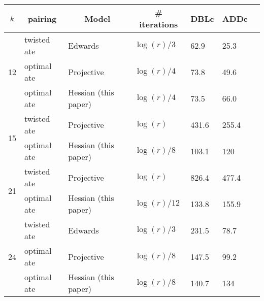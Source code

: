 \begin{table}[h]
\begin{tabular}{|l| l| l| l| l| l| l|}
\hline
\multicolumn{1}{|c|}{$k$}
&\multicolumn{1}{|c|}{pairing} 
&\multicolumn{1}{|c|}{Model}
&\multicolumn{1}{|c|}{\# iterations}
&\multicolumn{1}{|c|}{DBLc}	
&\multicolumn{1}{|c|}{ADDc}	
\\
\hline
\multirow{3}{*}{12} & twisted ate & Edwards~\cite{2014/LWZ} & $\log(r)/3$ & 62.9 & 25.3 \\
 & optimal ate & Projective~\cite{2009/craig} & $\log(r)/4$ & 73.8 & 49.6 \\
 & optimal ate & Hessian (this paper) & $\log(r)/4$ & 73.5 & 66.0 \\
\hline
\multirow{2}{*}{15} & twisted ate & Projective~\cite{2009/craig} & $\log(r)$ & 431.6 & 255.4 \\
 & optimal ate & Hessian (this paper) & $\log(r)/8$ & 103.1 & 120 \\
\hline
\multirow{2}{*}{21} & twisted ate & Projective~\cite{2009/craig} & $\log(r)$ & 826.4 & 477.4 \\
 & optimal ate & Hessian (this paper) & $\log(r)/12$ & 133.8 & 155.9 \\
\hline
\multirow{3}{*}{24} & twisted ate & Edwards~\cite{2014/LWZ} & $\log(r)/3$ & 231.5 & 78.7 \\
 & optimal ate & Projective~\cite{2009/craig} & $\log(r)/8$ & 147.5 & 99.2 \\
 & optimal ate & Hessian (this paper) & $\log(r)/8$ & 140.7 & 134 \\ \hline
\end{tabular}
\label{tbl-cmp1}
\end{table}

